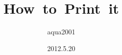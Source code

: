 
%
%

%
%

% 
%

\documentclass{article}
 
\title{How to Print it} 
\author{aqua2001} 
\date{2012.5.20} 
\maketitle 
\section{The first point} 
Hello world! 
\section{The second point} 
What is matrix? and so on. 
